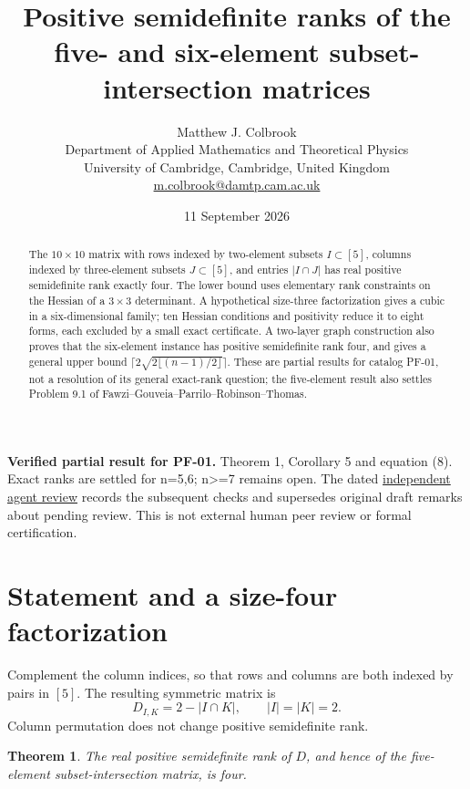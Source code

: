 \documentclass[11pt]{article}
\title{Positive semidefinite ranks of the five- and six-element subset-intersection matrices}
\author{Matthew J. Colbrook\\\small Department of Applied Mathematics and Theoretical Physics\\\small University of Cambridge, Cambridge, United Kingdom\\\small\href{mailto:m.colbrook@damtp.cam.ac.uk}{m.colbrook@damtp.cam.ac.uk}}\date{11 September 2026}
\newtheorem{theorem}{Theorem}
\begin{document}
\maketitle

\noindent\textbf{Verified partial result for PF-01.} Theorem 1, Corollary 5 and equation (8). Exact ranks are settled for n=5,6; n>=7 remains open.
The dated \href{https://github.com/MColbrook/OpenProblemsInNLA/blob/codex/colbrook-factorization-resolutions/references/colbrook-factorization-2026-09-11/verification/reviews/PF-01-review.md}{independent agent review} records the subsequent checks and supersedes original draft remarks about pending review. This is not external human peer review or formal certification.
\par\medskip

\begin{abstract}
The $10\times10$ matrix with rows indexed by two-element subsets $I\subset[5]$, columns indexed by three-element subsets $J\subset[5]$, and entries $|I\cap J|$ has real positive semidefinite rank exactly four. The lower bound uses elementary rank constraints on the Hessian of a $3\times3$ determinant. A hypothetical size-three factorization gives a cubic in a six-dimensional family; ten Hessian conditions and positivity reduce it to eight forms, each excluded by a small exact certificate. A two-layer graph construction also proves that the six-element instance has positive semidefinite rank four, and gives a general upper bound $\lceil2\sqrt{2\lfloor(n-1)/2\rfloor}\rceil$. These are partial results for catalog PF-01, not a resolution of its general exact-rank question; the five-element result also settles Problem 9.1 of Fawzi--Gouveia--Parrilo--Robinson--Thomas.
\end{abstract}

\section{Statement and a size-four factorization}
Complement the column indices, so that rows and columns are both indexed by pairs in $[5]$. The resulting symmetric matrix is
\[
 D_{I,K}=2-|I\cap K|,\qquad |I|=|K|=2.
\]
Column permutation does not change positive semidefinite rank.

\begin{theorem}\label{thm:main}
The real positive semidefinite rank of $D$, and hence of the five-element subset-intersection matrix, is four.
\end{theorem}
\end{document}
